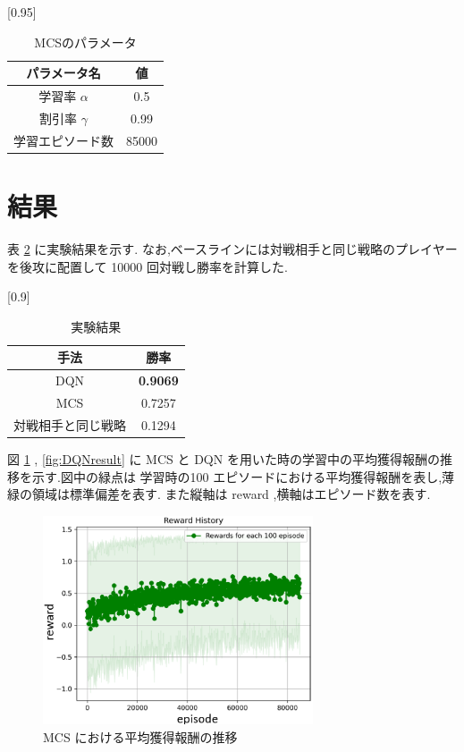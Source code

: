 \documentclass[twocolumn]{jarticle}     %
\begin{document}
    \begin{table}[H]
      \centering
      \caption{MCSのパラメータ}
      \vspace{-0.3cm}
      \label{table:mcsparam}
      \scalebox{0.95}[0.95]{
        \begin{tabular}{|c|c|}
          \hline
          パラメータ名 & 値 \\ \hline \hline
          学習率 $\alpha$ & 0.5 \\ \hline
          割引率 $\gamma$ & 0.99 \\ \hline     
          学習エピソード数 & 85000 \\ \hline
    
          \end{tabular}
      }
      \end{table}


\section{結果}
表 \ref{table:result} に実験結果を示す. なお,ベースラインには対戦相手と同じ戦略のプレイヤーを後攻に配置して 10000 回対戦し勝率を計算した.
\begin{table}[H]
  \centering
  \caption{実験結果}
  \vspace{-0.3cm}
  \label{table:result}
  \scalebox{0.9}[0.9]{
    \begin{tabular}{|c|c|}
      \hline
      手法 & 勝率 \\ \hline \hline
      DQN & \textbf{0.9069} \\ \hline
      MCS & 0.7257 \\ \hline     
      対戦相手と同じ戦略 & 0.1294 \\ \hline

      \end{tabular}
  }
  \end{table}

  図 \ref{fig:MCSresult} , \ref{fig:DQNresult} に MCS と DQN を用いた時の学習中の平均獲得報酬の推移を示す.図中の緑点は 学習時の100 エピソードにおける平均獲得報酬を表し,薄緑の領域は標準偏差を表す.
  また縦軸は reward ,横軸はエピソード数を表す. 

  \begin{figure}[H]
    \centering
    \includegraphics[width=80mm]{assets/MCS_update.eps.eps}
    \caption{MCS における平均獲得報酬の推移}
    \label{fig:MCSresult}
  \end{figure}
\end{document}
